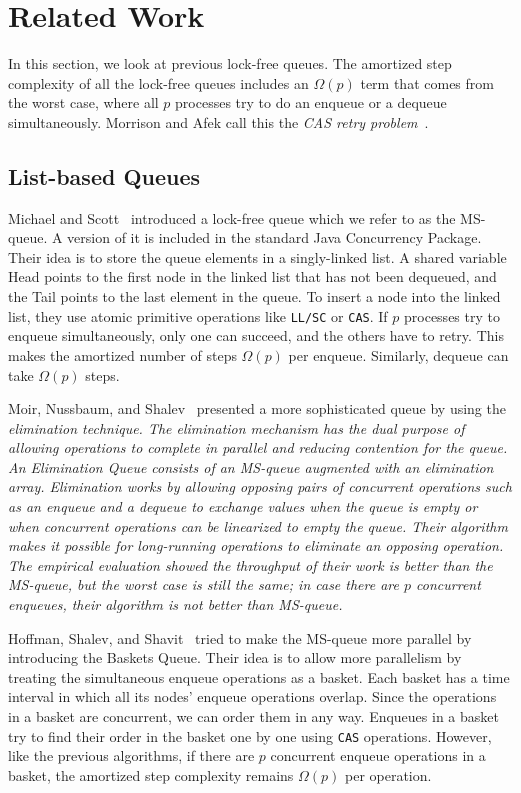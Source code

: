 
\section{Related Work}
In this section, we look at previous lock-free queues. The amortized
step complexity of all the lock-free queues includes an $\Omega(p)$
term that comes from the worst case, where all $p$ processes try to do
an enqueue or a dequeue simultaneously. Morrison and Afek call this
the \textit{CAS retry problem}~\cite{DBLP:conf/ppopp/MorrisonA13}.  

\subsection{List-based Queues}
Michael and Scott~\cite{DBLP:conf/podc/MichaelS96} introduced a
lock-free queue which we refer to as the MS-queue. A version of it is
included in the standard Java Concurrency Package. Their idea is to
store the queue elements in a singly-linked list. A shared variable
Head points to the first node in the linked list that has not been
dequeued, and the Tail points to the last element in the queue. To
insert a node into the linked list, they use atomic primitive
operations like \texttt{LL/SC} or \texttt{CAS}. If $p$ processes try
to enqueue simultaneously, only one can succeed, and the others have
to retry. This makes the amortized number of steps $\Omega(p)$ per
enqueue. Similarly, dequeue can take $\Omega(p)$ steps. 

Moir, Nussbaum, and Shalev~\cite{DBLP:conf/spaa/MoirNSS05} presented a
more sophisticated queue by using the \it{elimination} technique. The
elimination mechanism has the dual purpose of allowing operations to
complete in parallel and reducing contention for the queue. An
Elimination Queue consists of an MS-queue augmented with an
elimination array. Elimination works by allowing opposing pairs of
concurrent operations such as an enqueue and a dequeue to exchange
values when the queue is empty or when concurrent operations can be
linearized to empty the queue. Their algorithm makes it possible for
long-running operations to eliminate an opposing operation. The
empirical evaluation showed the throughput of their work is better
than the MS-queue, but the worst case is still the same; in case there
are $p$ concurrent enqueues, their algorithm is not better than
MS-queue.  

Hoffman, Shalev, and Shavit~\cite{DBLP:conf/opodis/HoffmanSS07} tried
to make the MS-queue more parallel by introducing the Baskets
Queue. Their idea is to allow more parallelism by treating the
simultaneous enqueue operations as a basket. Each basket has a time
interval in which all its nodes' enqueue operations overlap. Since the
operations in a basket are concurrent, we can order them in any
way. Enqueues in a basket try to find their order in the basket one by
one using \texttt{CAS} operations. However, like the previous
algorithms, if there are $p$ concurrent enqueue operations in a
basket, the amortized step complexity remains $\Omega(p)$ per
operation. 

